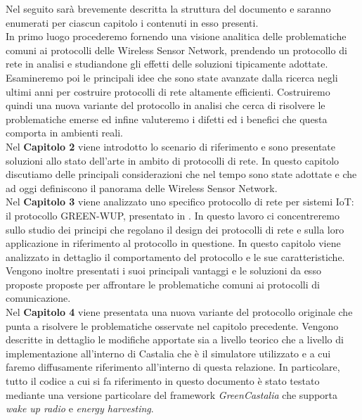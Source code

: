 \documentclass[binding=0.6cm,TFA]{sapthesis}
\begin{document}
Nel seguito sarà brevemente descritta la struttura del documento e saranno enumerati per ciascun capitolo i contenuti in esso presenti.\\

In primo luogo procederemo fornendo una visione analitica delle problematiche comuni ai protocolli delle Wireless Sensor
Network, prendendo un protocollo di rete in analisi e studiandone gli effetti delle soluzioni tipicamente adottate. Esamineremo poi le principali
idee che sono state avanzate dalla ricerca negli ultimi anni per costruire protocolli di rete altamente efficienti. Costruiremo quindi una nuova variante
del protocollo in analisi che cerca di risolvere le problematiche emerse ed infine valuteremo i difetti ed i benefici che questa comporta in ambienti reali.\\

Nel \textbf{Capitolo 2} viene introdotto lo scenario di riferimento e sono presentate soluzioni allo stato dell'arte in ambito di protocolli di rete. In questo
capitolo discutiamo delle principali considerazioni che nel tempo sono state adottate e che ad oggi definiscono il panorama delle Wireless Sensor Network.\\

Nel \textbf{Capitolo 3} viene analizzato uno specifico protocollo di rete per sistemi IoT: il protocollo GREEN-WUP, presentato in \cite{novel-wake-up-receiver-paper}.
In questo lavoro ci concentreremo sullo studio dei principi che regolano il design dei protocolli di rete e sulla loro applicazione in riferimento al
protocollo in questione. In questo capitolo viene analizzato in dettaglio il comportamento del protocollo e le sue caratteristiche. Vengono inoltre presentati i
suoi principali vantaggi e le soluzioni da esso proposte proposte per affrontare le problematiche comuni ai protocolli di comunicazione.\\

Nel \textbf{Capitolo 4} viene presentata una nuova variante del protocollo originale che punta a risolvere le problematiche osservate nel capitolo precedente.
Vengono descritte in dettaglio le modifiche apportate sia a livello teorico che a livello di implementazione all'interno di Castalia che è
il simulatore utilizzato e a cui faremo diffusamente riferimento all'interno di questa relazione. In particolare, tutto il codice
a cui si fa riferimento in questo documento è stato testato mediante una versione particolare del framework \emph{GreenCastalia} \cite{greencastalia-paper}
che supporta \emph{wake up radio} e \emph{energy harvesting}.\\
\end{document}
